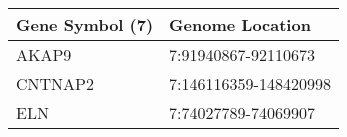 \begin{tabular}{ll}
\toprule
Gene Symbol (7) &       Genome Location \\
\midrule
          AKAP9 &   7:91940867-92110673 \\
        CNTNAP2 & 7:146116359-148420998 \\
            ELN &   7:74027789-74069907 \\
\bottomrule
\end{tabular}
